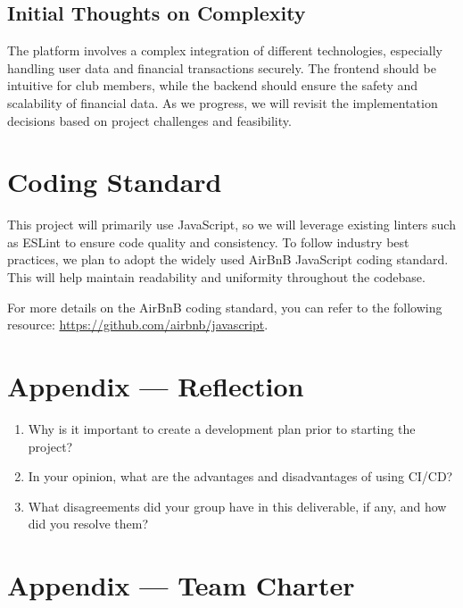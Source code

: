 \documentclass{article}
\begin{document}
\subsection{Initial Thoughts on Complexity}
The platform involves a complex integration of different technologies, especially handling user data and financial transactions securely. The frontend should be intuitive for club members, while the backend should ensure the safety and scalability of financial data. As we progress, we will revisit the implementation decisions based on project challenges and feasibility.


\section{Coding Standard}

This project will primarily use JavaScript, so we will leverage existing linters such as ESLint to ensure code quality and consistency. To follow industry best practices, we plan to adopt the widely used AirBnB JavaScript coding standard. This will help maintain readability and uniformity throughout the codebase.

For more details on the AirBnB coding standard, you can refer to the following resource: \url{https://github.com/airbnb/javascript}.

\section*{Appendix --- Reflection}




\begin{enumerate}
    \item Why is it important to create a development plan prior to starting the
    project?
    \item In your opinion, what are the advantages and disadvantages of using
    CI/CD?
    \item What disagreements did your group have in this deliverable, if any,
    and how did you resolve them?
\end{enumerate}

\newpage{}

\section*{Appendix --- Team Charter}
\end{document}

